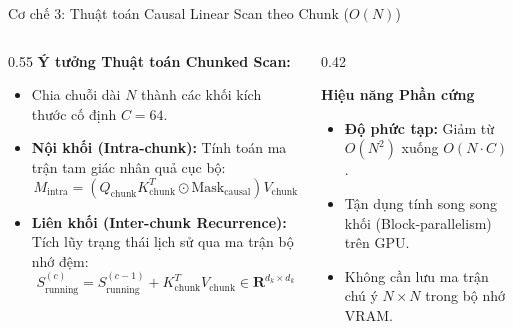 \documentclass[aspectratio=169, 10pt]{beamer}
\begin{document}
\begin{frame}{Cơ chế 3: Thuật toán Causal Linear Scan theo Chunk ($O(N)$)}
  \begin{columns}
    \begin{column}{0.55\textwidth}
      \textbf{Ý tưởng Thuật toán Chunked Scan:}
      \begin{itemize}
        \item Chia chuỗi dài $N$ thành các khối kích thước cố định $C = 64$.
        \item \textbf{Nội khối (Intra-chunk):} Tính toán ma trận tam giác nhân quả cục bộ:
          $$M_{\text{intra}} = (Q_{\text{chunk}} K_{\text{chunk}}^T \odot \text{Mask}_{\text{causal}}) V_{\text{chunk}}$$
        \item \textbf{Liên khối (Inter-chunk Recurrence):} Tích lũy trạng thái lịch sử qua ma trận bộ nhớ đệm:
          $$S_{\text{running}}^{(c)} = S_{\text{running}}^{(c-1)} + K_{\text{chunk}}^T V_{\text{chunk}} \in \mathbf{R}^{d_k \times d_k}$$
      \end{itemize}
    \end{column}
    \begin{column}{0.42\textwidth}
      \begin{block}{\textbf{Hiệu năng Phần cứng}}
        \begin{itemize}
          \item \textbf{Độ phức tạp:} Giảm từ $O(N^2)$ xuống $O(N \cdot C)$.
          \item Tận dụng tính song song khối (Block-parallelism) trên GPU.
          \item Không cần lưu ma trận chú ý $N \times N$ trong bộ nhớ VRAM.
        \end{itemize}
      \end{block}
    \end{column}
  \end{columns}
\end{frame}
\end{document}
